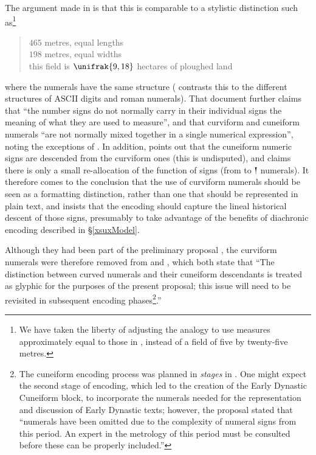 \documentclass[10pt, a4paper, twoside]{article}
\newcommand\oneAšC{{\proposalfont\symbol{"12550}}} %
\begin{document}
The argument made in \cite[4]{L2/04-099} is that this is comparable to a stylistic distinction such as\footnote{We
have taken the liberty of adjusting the analogy to use measures approximately equal to those in \cite{P020054},
instead of a field of five by twenty-five metres.}
\begin{quote}
$465$ metres, equal lengths\\
$198$ metres, equal widths\\
this field is $\unifrak{9,18}$ hectares of ploughed land
\end{quote}
where the numerals have the same structure (\cite{L2/04-099} contrasts this to the different structures
of ASCII digits and roman numerals).
That document further claims that ``the number signs do not normally carry in their individual signs the
meaning of what they are used to measure'', and that curviform and cuneiform numerals ``are not normally mixed together
in a single numerical expression'', noting the exceptions of \cites{P232278}{P232280}.
In addition, \cite[4]{L2/04-099} points out that the cuneiform numeric signs are descended from
the curviform ones (this is undisputed),
and claims there is only a small re-allocation of the function of signs
(from \oneAšC{} to {\xsuxfont 𒁹} numerals).
It therefore comes to the conclusion that the use of curviform
numerals should be seen as a formatting distinction,
rather than one that should be represented in plain text,
and insists that the encoding should capture the lineal
historical descent of those signs, presumably to take
advantage of the benefits of diachronic encoding described
in §\ref{xsuxModel}.

Although they had been part of the preliminary proposal \cite{L2/03-393R},
the curviform numerals were therefore removed from \cite{L2/04-036} and \cite{L2/04-189},
which both state that ``The distinction between curved numerals and their cuneiform descendants
is treated as glyphic for the purposes of the present proposal;
this issue will need to be revisited in subsequent encoding phases\footnote{The
cuneiform encoding process was planned in \emph{stages} in \cite{L2/03-162}.
One might expect the second stage of encoding, which led to the creation of the Early Dynastic Cuneiform
block, to incorporate the numerals needed for the representation and discussion of Early Dynastic texts;
however, the proposal \cite{L2/12-208} stated that
``numerals have been omitted due to the complexity of numeral signs from this period.
An expert in the metrology of this period must be consulted before these can be properly included.''}.''
\end{document}
